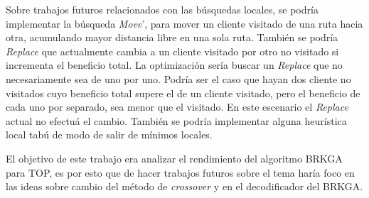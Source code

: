 \bigskip

Sobre trabajos futuros relacionados con las búsquedas locales, se podría implementar la búsqueda \textit{Move}', para mover un cliente visitado de una ruta hacia otra, acumulando mayor distancia libre en una sola ruta. También se podría \textit{Replace} que actualmente cambia a un cliente visitado por otro no visitado si incrementa el beneficio total. La optimización sería buscar un \textit{Replace} que no necesariamente sea de uno por uno. Podría ser el caso que hayan dos cliente no visitados cuyo beneficio total supere el de un cliente visitado, pero el beneficio de cada uno por separado, sea menor que el visitado. En este escenario el \textit{Replace} actual no efectuá el cambio. También se podría implementar alguna heurística local tabú de modo de salir de mínimos locales.

\bigskip

El objetivo de este trabajo era analizar el rendimiento del algoritmo BRKGA para TOP, es por esto que de hacer trabajos futuros sobre el tema haría foco en las ideas sobre cambio del método de \textit{crossover} y en el decodificador del BRKGA.








